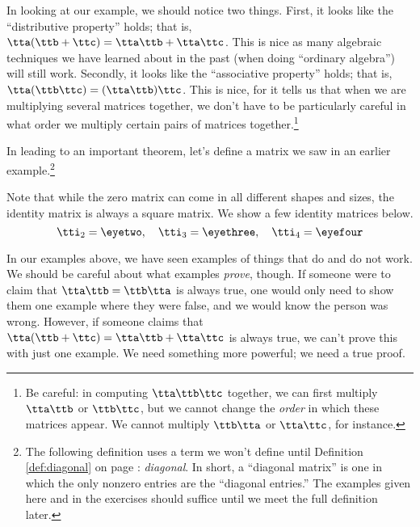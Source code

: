 \medskip

In looking at our example, we should notice two things. First, it looks like the ``distributive property'' holds; that is, $\tta(\ttb+\ttc) = \tta\ttb + \tta\ttc$. This is nice as many algebraic techniques we have learned about in the past (when doing ``ordinary algebra'') will still work. Secondly, it looks like the ``associative property'' holds; that is, $\tta(\ttb\ttc) = (\tta\ttb)\ttc$. This is nice, for it tells us that when we are multiplying several matrices together, we don't have to be particularly careful in what order we multiply certain pairs of matrices together.\footnote{Be careful: in computing $\tta\ttb\ttc$ together, we can first multiply $\tta\ttb$ or $\ttb\ttc$, but we cannot change the \textit{order} in which these matrices appear. We cannot multiply $\ttb\tta$ or $\tta\ttc$, for instance.}							


In leading to an important theorem, let's define a matrix we saw in an earlier example.\footnote{The following definition uses a term we won't define until Definition \ref{def:diagonal} on page \pageref{def:diagonal}: \textit{diagonal}. In short, a ``diagonal matrix'' is one in which the only nonzero entries are the ``diagonal entries.'' The examples given here and in the exercises should suffice until we meet the full definition later.}

\smallskip


\smallskip

Note that while the zero matrix can come in all different shapes and sizes, the identity matrix is always a square matrix. We show a few identity matrices below. 
\[
\tti_2= \eyetwo ,\quad \tti_3 = \eyethree , \quad \tti_4 = \eyefour
\]

In our examples above, we have seen examples of things that do and do not work. We should be careful about what examples \textit{prove}, though. If someone were to claim that $\tta\ttb = \ttb\tta$ is always true, one would only need to show them one example where they were false, and we would know the person was wrong. However, if someone claims that $\tta(\ttb+\ttc) = \tta\ttb+\tta\ttc$ is always true, we can't prove this with just one example. We need something more powerful; we need a true proof. 

